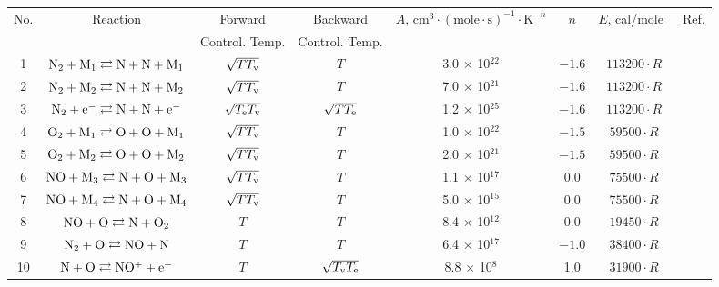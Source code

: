 \documentclass{warpdoc}
\renewcommand{\fontsizetable}{\footnotesize\scalefont{0.9}}
\begin{document}
%
\begin{table}[t]
\fontsizetable
\begin{center}
\begin{threeparttable}
\begin{tabular}{cccccccc} 
\toprule
No. & Reaction\tnote{(b)} & Forward          & Backward    & $A$, $\textrm{cm}^3\cdot(\textrm{mole}\cdot \textrm{s})^{-1}\cdot \textrm{K}^{-n}$ & $n$ & $E$, cal/mole~\tnote{(a)} & Ref.\\ 
~   & ~                   & Control. Temp.   & Control. Temp.\tnote{(c)} &~ & ~ & ~ & ~\\
\midrule
1 & $\rm N_2 + M_1 \rightleftarrows N + N + M_1$ & $\sqrt{T T_{\rm v}}$ & $T$ & 3.0 $\times$ 10$^{22}$  & $-1.6$ & $113200 \cdot R$ & \cite{book:1990:park}\\
2 & $\rm N_2 + M_2 \rightleftarrows N + N + M_2$ & $\sqrt{T T_{\rm v}}$ & $T$ & 7.0 $\times$ 10$^{21}$  & $-1.6$ & $113200 \cdot R$ & \cite{book:1990:park}\\
3 & $\rm N_2 + e^- \rightleftarrows N + N + e^-$ & $\sqrt{T_{\rm e} T_{\rm v}}$ & $\sqrt{T T_{\rm e}}$ & 1.2 $\times$ 10$^{25}$  & $-1.6$ & $113200 \cdot R$ & \cite{aiaaconf:1991:sharma}\\
4 & $\rm O_2 + M_1 \rightleftarrows O + O + M_1$ & $\sqrt{T T_{\rm v}}$ & $T$ & 1.0 $\times$ 10$^{22}$  & $-1.5$ & $59500 \cdot R$ & \cite{book:1990:park}\\
5 & $\rm O_2 + M_2 \rightleftarrows O + O + M_2$ & $\sqrt{T T_{\rm v}}$ & $T$ & 2.0 $\times$ 10$^{21}$  & $-1.5$ & $59500 \cdot R$ & \cite{book:1990:park}\\
6 & $\rm NO + M_3 \rightleftarrows N + O + M_3$ & $\sqrt{T T_{\rm v}}$ & $T$ & 1.1 $\times$ 10$^{17}$  & 0.0 & $75500 \cdot R$ & \cite{book:1990:park}\\
7 & $\rm NO + M_4 \rightleftarrows N + O + M_4$ & $\sqrt{T T_{\rm v}}$ & $T$ & 5.0 $\times$ 10$^{15}$  & 0.0 & $75500 \cdot R$ & \cite{book:1990:park}\\
8 & $\rm NO + O \rightleftarrows N + O_2 $ & $T$ & $T$ & 8.4 $\times$ 10$^{12}$  & 0.0 & $19450 \cdot R$ & \cite{book:1990:park}\\
9 & $\rm N_2 + O \rightleftarrows NO + N $ & $T$ & $T$ & 6.4 $\times$ 10$^{17}$  & $-1.0$ & $38400 \cdot R$ & \cite{book:1990:park}\\
10 & $\rm N + O \rightleftarrows NO^+ + e^- $ & $T$ & $\sqrt{T_{\rm v}T_{\rm e}}$ & 8.8 $\times$ 10$^{8}$  & 1.0 & $31900 \cdot R$ & \cite{jtht:1993:park}\\

\end{tabular}
\end{threeparttable}
\end{center}
\end{table}
\end{document}
